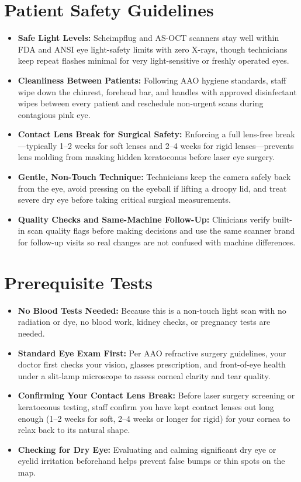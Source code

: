 \section{Patient Safety Guidelines}
\begin{itemize}
    \item \textbf{Safe Light Levels:} Scheimpflug and AS-OCT scanners stay well within FDA and ANSI eye light-safety limits with zero X-rays, though technicians keep repeat flashes minimal for very light-sensitive or freshly operated eyes.
    \item \textbf{Cleanliness Between Patients:} Following AAO hygiene standards, staff wipe down the chinrest, forehead bar, and handles with approved disinfectant wipes between every patient and reschedule non-urgent scans during contagious pink eye.
    \item \textbf{Contact Lens Break for Surgical Safety:} Enforcing a full lens-free break---typically 1--2 weeks for soft lenses and 2--4 weeks for rigid lenses---prevents lens molding from masking hidden keratoconus before laser eye surgery.
    \item \textbf{Gentle, Non-Touch Technique:} Technicians keep the camera safely back from the eye, avoid pressing on the eyeball if lifting a droopy lid, and treat severe dry eye before taking critical surgical measurements.
    \item \textbf{Quality Checks and Same-Machine Follow-Up:} Clinicians verify built-in scan quality flags before making decisions and use the same scanner brand for follow-up visits so real changes are not confused with machine differences.
\end{itemize}

\section{Prerequisite Tests}
\begin{itemize}
    \item \textbf{No Blood Tests Needed:} Because this is a non-touch light scan with no radiation or dye, no blood work, kidney checks, or pregnancy tests are needed.
    \item \textbf{Standard Eye Exam First:} Per AAO refractive surgery guidelines, your doctor first checks your vision, glasses prescription, and front-of-eye health under a slit-lamp microscope to assess corneal clarity and tear quality.
    \item \textbf{Confirming Your Contact Lens Break:} Before laser surgery screening or keratoconus testing, staff confirm you have kept contact lenses out long enough (1--2 weeks for soft, 2--4 weeks or longer for rigid) for your cornea to relax back to its natural shape.
    \item \textbf{Checking for Dry Eye:} Evaluating and calming significant dry eye or eyelid irritation beforehand helps prevent false bumps or thin spots on the map.
\end{itemize}

